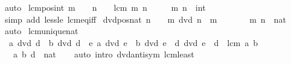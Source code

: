 \begin{isabellebody}
\ auto%
\endisatagproof
{\isafoldproof}%
%
\isadelimproof
\isanewline
%
\endisadelimproof
\isanewline
{}\isamarkupfalse%
\ lcm{\isacharunderscore}{\kern0pt}pos{\isacharunderscore}{\kern0pt}int{\isacharcolon}{\kern0pt}\ {\isachardoublequoteopen}m\ {\isasymnoteq}\ {}\ {\isasymLongrightarrow}\ n\ {\isasymnoteq}\ {}\ {\isasymLongrightarrow}\ lcm\ m\ n\ {\isachargreater}{\kern0pt}\ {}{\isachardoublequoteclose}\isanewline
\ \ \ m\ n\ {\isacharcolon}{\kern0pt}{\isacharcolon}{\kern0pt}\ int\isanewline
%
\isadelimproof
\ \ %
\endisadelimproof
%
\isatagproof
{}\isamarkupfalse%
\ {\isacharparenleft}{\kern0pt}simp\ add{\isacharcolon}{\kern0pt}\ less{\isacharunderscore}{\kern0pt}le\ lcm{\isacharunderscore}{\kern0pt}eq{\isacharunderscore}{\kern0pt}{}{\isacharunderscore}{\kern0pt}iff{\isacharparenright}{\kern0pt}%
\endisatagproof
{\isafoldproof}%
%
\isadelimproof
\isanewline
%
\endisadelimproof
\isanewline
{}\isamarkupfalse%
\ dvd{\isacharunderscore}{\kern0pt}pos{\isacharunderscore}{\kern0pt}nat{\isacharcolon}{\kern0pt}\ {\isachardoublequoteopen}n\ {\isachargreater}{\kern0pt}\ {}\ {\isasymLongrightarrow}\ m\ dvd\ n\ {\isasymLongrightarrow}\ m\ {\isachargreater}{\kern0pt}\ {}{\isachardoublequoteclose}\ \ \isanewline
\ \ \ m\ n\ {\isacharcolon}{\kern0pt}{\isacharcolon}{\kern0pt}\ nat\isanewline
%
\isadelimproof
\ \ %
\endisadelimproof
%
\isatagproof
{}\isamarkupfalse%
\ auto%
\endisatagproof
{\isafoldproof}%
%
\isadelimproof
\isanewline
%
\endisadelimproof
\isanewline
{}\isamarkupfalse%
\ lcm{\isacharunderscore}{\kern0pt}unique{\isacharunderscore}{\kern0pt}nat{\isacharcolon}{\kern0pt}\isanewline
\ \ {\isachardoublequoteopen}a\ dvd\ d\ {\isasymand}\ b\ dvd\ d\ {\isasymand}\ {\isacharparenleft}{\kern0pt}{\isasymforall}e{\isachardot}{\kern0pt}\ a\ dvd\ e\ {\isasymand}\ b\ dvd\ e\ {\isasymlongrightarrow}\ d\ dvd\ e{\isacharparenright}{\kern0pt}\ {\isasymlongleftrightarrow}\ d\ {\isacharequal}{\kern0pt}\ lcm\ a\ b{\isachardoublequoteclose}\isanewline
\ \ \ a\ b\ d\ {\isacharcolon}{\kern0pt}{\isacharcolon}{\kern0pt}\ nat\isanewline
%
\isadelimproof
\ \ %
\endisadelimproof
%
\isatagproof
{}\isamarkupfalse%
\ {\isacharparenleft}{\kern0pt}auto\ intro{\isacharcolon}{\kern0pt}\ dvd{\isacharunderscore}{\kern0pt}antisym\ lcm{\isacharunderscore}{\kern0pt}least{\isacharparenright}{\kern0pt}%
\endisatagproof
{\isafoldproof}%
%
\isadelimproof
\isanewline
%
\endisadelimproof
\isanewline

\end{isabellebody}
